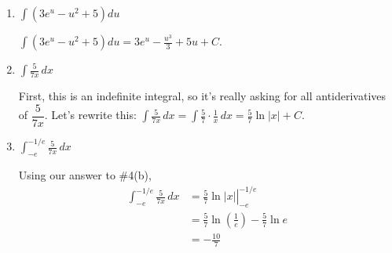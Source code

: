 \documentclass[main]{subfiles}
\begin{document}
\begin{enumerate}[resume,topsep=0pt]
  \begin{enumerate}

  \item

    \begin{problem}[\vfill]
      $\displaystyle \int \left(3e^u -u^2 + 5\right) du$
    \end{problem}

    \begin{solution}
      $\displaystyle \int \left(3e^u - u^2 +5 \right) du = \boxed{3 e^u -
        \frac{u^3}{3} + 5u + C}$.
    \end{solution}

    \item

    \begin{problem}[\vfill]
      $\displaystyle \int \frac{5}{7x}\,dx$
    \end{problem}

    \begin{solution}
      First, this is an indefinite integral, so it's really asking for
      all antiderivatives of $\dfrac{5}{7x}$.  Let's rewrite this:
      $\displaystyle \int \frac{5}{7x}\,dx = \int \frac{5}{7} \cdot
      \frac{1}{x}\,dx = \boxed{\frac{5}{7} \ln |x| + C}$.
    \end{solution}

  \item


    \begin{problem}[\vfill\newpage]
      $\displaystyle \int_{-e}^{-1/e} \frac{5}{7x}\,dx$
    \end{problem}

    \begin{solution}
      Using our answer to {{{{\#4}}(b)}}, 
      \begin{align*}
        \int_{-e}^{-1/e} \frac{5}{7x}\,dx &= \left. \frac{5}{7} \ln |x|
        \right|_{-e}^{-1/e} \\
        &= \frac{5}{7} \ln \left( \frac{1}{e} \right) - \frac{5}{7} \ln e
        \\ 
        &= \boxed{- \frac{10}{7}}
      \end{align*}
    \end{solution}


\end{enumerate}
\end{enumerate}
\end{document}
